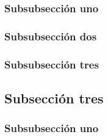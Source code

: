 \subsubsection{Subsubsección uno}\label{subsubseccion:SubsubseccionUnoSubseccionUnoSeccionTresCapituloUno}

\subsubsection{Subsubsección dos}\label{subsubseccion:SubsubseccionDosSubseccionUnoSeccionTresCapituloUno}

\subsubsection{Subsubsección tres}\label{subsubseccion:SubsubseccionTresSubseccionUnoSeccionTresCapituloUno}

\subsection{Subsección tres}\label{subseccion:SubseccionTresSeccionTresCapituloUno} 

\subsubsection{Subsubsección uno}\label{subsubseccion:SubsubseccionUnoSubseccionTresSeccionTresCapituloUno}